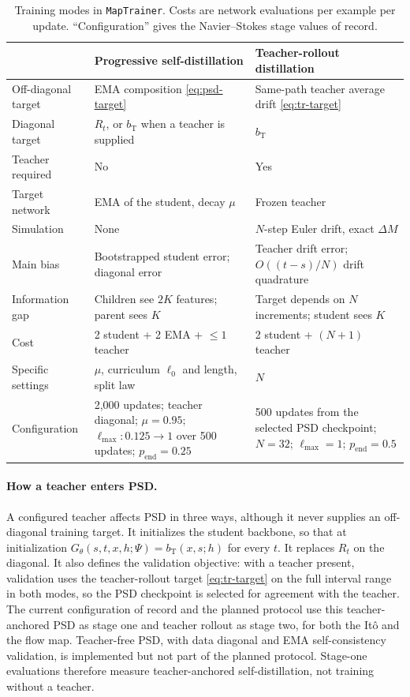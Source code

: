 \begin{table}[t]
\caption{Training modes in \texttt{MapTrainer}. Costs are network evaluations per example per update. ``Configuration'' gives the Navier--Stokes stage values of record.}
\label{tab:training-modes}
\centering\small
\begin{tabular}{@{}p{}p{}p{}@{}}
\toprule
 & Progressive self-distillation & Teacher-rollout distillation\\
\midrule
Off-diagonal target & EMA composition \eqref{eq:psd-target} & Same-path teacher average drift \eqref{eq:tr-target}\\
Diagonal target & $R_t$, or $b_{\mathrm T}$ when a teacher is supplied & $b_{\mathrm T}$\\
Teacher required & No & Yes\\
Target network & EMA of the student, decay $\mu$ & Frozen teacher\\
Simulation & None & $N$-step Euler drift, exact $\Delta M$\\
Main bias & Bootstrapped student error; diagonal error & Teacher drift error; $O((t-s)/N)$ drift quadrature\\
Information gap & Children see $2K$ features; parent sees $K$ & Target depends on $N$ increments; student sees $K$\\
Cost & 2 student + 2 EMA + $\le1$ teacher & 2 student + $(N+1)$ teacher\\
Specific settings & $\mu$, curriculum $\ell_0$ and length, split law & $N$\\
Configuration & 2,000 updates; teacher diagonal; $\mu=0.95$; $\ell_{\max}\colon0.125\to1$ over 500 updates; $p_{\mathrm{end}}=0.25$ & 500 updates from the selected PSD checkpoint; $N=32$; $\ell_{\max}=1$; $p_{\mathrm{end}}=0.5$\\
\bottomrule
\end{tabular}
\end{table}

\paragraph{How a teacher enters PSD.} A configured teacher affects PSD in three ways, although it never supplies an off-diagonal training target. It initializes the student backbone, so that at initialization $G_\theta(s,t,x,h;\Psi)=b_{\mathrm T}(x,s;h)$ for every $t$. It replaces $R_t$ on the diagonal. It also defines the validation objective: with a teacher present, validation uses the teacher-rollout target \eqref{eq:tr-target} on the full interval range in both modes, so the PSD checkpoint is selected for agreement with the teacher. The current configuration of record and the planned protocol use this teacher-anchored PSD as stage one and teacher rollout as stage two, for both the It\^o and the flow map. Teacher-free PSD, with data diagonal and EMA self-consistency validation, is implemented but not part of the planned protocol. Stage-one evaluations therefore measure teacher-anchored self-distillation, not training without a teacher.
